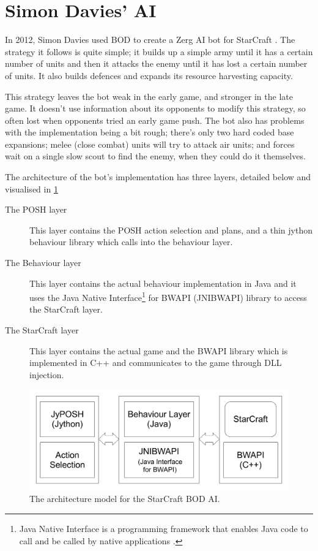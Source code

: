 \documentclass[11pt,openright,a4paper]{report}
\begin{document}
\section{Simon Davies' AI}
In 2012, Simon Davies used BOD to create a Zerg AI bot for StarCraft \cite{davies2012}. The strategy it follows is quite simple; it builds up a simple army until it has a certain number of units and then it attacks the enemy until it has lost a certain number of units. It also builds defences and expands its resource harvesting capacity.

This strategy leaves the bot weak in the early game, and stronger in the late game. It doesn't use information about its opponents to modify this strategy, so often lost when opponents tried an early game push. The bot also has problems with the implementation being a bit rough; there's only two hard coded base expansions; melee (close combat) units will try to attack air units; and forces wait on a single slow scout to find the enemy, when they could do it themselves.

The architecture of the bot's implementation has three layers, detailed below and visualised in \ref{fig:AI-Architecture}
\begin{description}
\item[The POSH layer] This layer contains the POSH action selection and plans, and a thin jython behaviour library which calls into the behaviour layer.
\item[The Behaviour layer] This layer contains the actual behaviour implementation in Java and it uses the Java Native Interface\footnote{Java Native Interface is a programming framework that enables Java code to call and be called by native applications \cite{JNIDef}.} for BWAPI (JNIBWAPI) library \cite{JNIBWAPI} to access the StarCraft layer.
\item[The StarCraft layer] This layer contains the actual game and the BWAPI library which is implemented in C++ and communicates to the game through DLL injection.
\end{description}
\begin{figure}[h]
    \centering
    \includegraphics[scale=0.5]{AIArch}
    \caption{The architecture model for the StarCraft BOD AI. \protect\cite{davies2012}}
    \label{fig:AI-Architecture}
\end{figure}
\end{document}
